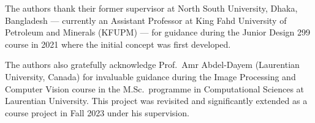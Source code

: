 \documentclass[10pt,twocolumn]{article}
\begin{document}
The authors thank their former supervisor at North South University, Dhaka,
Bangladesh --- currently an Assistant Professor at King Fahd University of
Petroleum and Minerals (KFUPM) --- for guidance during the Junior Design 299
course in 2021 where the initial concept was first developed.

The authors also gratefully acknowledge Prof.\ Amr Abdel-Dayem (Laurentian
University, Canada) for invaluable guidance during the Image Processing and
Computer Vision course in the M.Sc.\ programme in Computational Sciences at
Laurentian University. This project was revisited and significantly extended
as a course project in Fall 2023 under his supervision.

\end{document}
